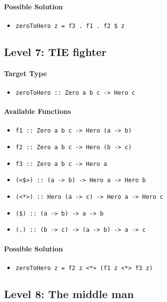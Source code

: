\documentclass[preprint,12pt]{elsarticle}
\begin{document}
\paragraph{Possible Solution} 
\begin{itemize}
    \item \texttt{zeroToHero z = f3 . f1 . f2 \$ z}
\end{itemize}

\subsection{Level 7: TIE fighter}
\paragraph{Target Type } 
\begin{itemize}
    \item \texttt{zeroToHero :: Zero a b c -> Hero c}
\end{itemize}

\paragraph{Available Functions} 
\begin{itemize}
    \item \texttt{f1 :: Zero a b c -> Hero (a -> b)}
    \item \texttt{f2 :: Zero a b c -> Hero (b -> c)}
    \item \texttt{f3 :: Zero a b c -> Hero a}
    \item \texttt{(<\$>) :: (a -> b) -> Hero a -> Hero b}
    \item \texttt{(<*>) :: Hero (a -> c) -> Hero a -> Hero c}
    \item \texttt{(\$) :: (a -> b) -> a -> b}
    \item \texttt{(.) :: (b -> c) -> (a -> b) -> a -> c}
\end{itemize}

\paragraph{Possible Solution} 
\begin{itemize}
    \item \texttt{zeroToHero z = f2 z <*> (f1 z <*> f3 z)}
\end{itemize}

\subsection{Level 8: The middle man}
\end{document}
